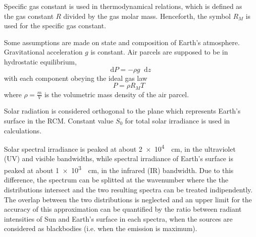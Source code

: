 \documentclass[a4paper,10pt,draft,twocolumn]{article}
\newcommand{\dd}{\mathop{}\!\mathrm{d}}
\begin{document}
Specific gas constant is used in thermodynamical relations, which is defined as the gas constant $R$ divided by the gas molar mass. Henceforth, the symbol $R_M$ is used for the specific gas constant.

Some assumptions are made on state and composition of Earth's atmosphere. 
Gravitational acceleration $g$ is constant. Air parcels are supposed to be in hydrostatic equilibrium,
\begin{equation}
  \label{eq:hydrostatic_equilibrium}
  \dd P = - \rho g \dd z
\end{equation}
with each component obeying the ideal gas law
\begin{equation}
  \label{eq:ideal_gas_law}
  P = \rho R_M T
\end{equation}
where $\rho = \frac{m}{V}$ is the volumetric mass density of the air parcel.

Solar radiation is considered orthogonal to the plane which represents Earth's surface in the RCM. Constant value $S_0$ for total solar irradiance is used in calculations.

Solar spectral irradiance is peaked at about \qty{2e4}{\per\centi\metre}, in the ultraviolet (UV) and visible bandwidths, while spectral irradiance of Earth's surface is peaked at about \qty{1e3}{\per\centi\metre}, in the infrared (IR) bandwidth. Due to this difference, the spectrum can be splitted at the wavenumber where the the distributions intersect and the two resulting spectra can be treated indipendently. The overlap between the two distributions is neglected and an upper limit for the accuracy of this approximation can be quantified by the ratio between radiant intensities of Sun and Earth's surface in each spectra, when the sources are considered as blackbodies (i.e. when the emission is maximum). %
\end{document}

